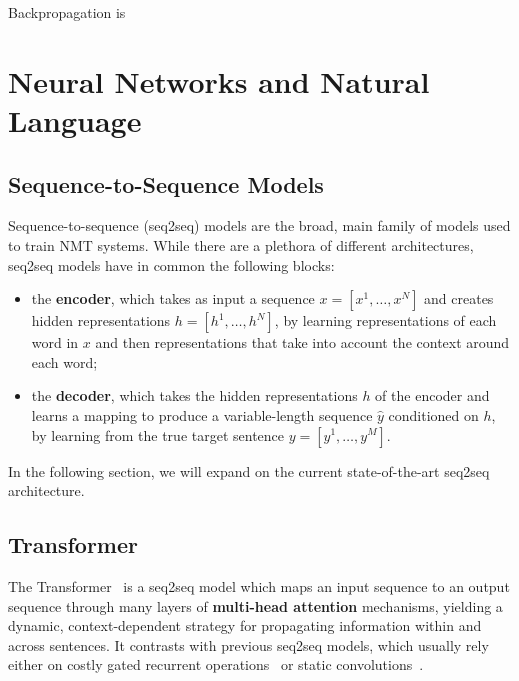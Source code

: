 \begin{definition}[Backpropagation]
    Backpropagation is
\end{definition}


\section{Neural Networks and Natural Language}

\subsection{Sequence-to-Sequence Models}
\label{sec:transformer_bg}


Sequence-to-sequence (seq2seq) models are the broad, main family of models
used to train NMT systems. While there are a plethora of different architectures,
seq2seq models have in common the following blocks:

\begin{itemize}
    \item the {\bf encoder}, which takes as input a sequence $x=[x^1,
              \dots, x^N]$ and creates hidden representations $h=[h^1, \dots,
              h^N]$, by learning representations of each word in $x$ and then
          representations that take into account the context around each word;
    \item the {\bf decoder}, which takes the hidden representations
          $h$ of the encoder and learns a mapping to produce a
          variable-length sequence $\hat{y}$ conditioned on $h$, by
          learning from the true target sentence $y=[y^1, \dots, y^M]$.
\end{itemize}

In the following section, we will expand on the current
state-of-the-art seq2seq architecture.

\subsection{Transformer}

The Transformer~\citep{vaswani2017attention} is a seq2seq model which
maps an input sequence to an output sequence through many layers of
\textbf{multi-head attention} mechanisms, yielding a dynamic,
context-dependent strategy for propagating information within and
across sentences. It contrasts with previous seq2seq models, which
usually rely either on costly gated recurrent operations~\citep[often
    LSTMs:][]{bahdanau2014neural,luong2015effective} or static
convolutions~\citep{convseq}.

